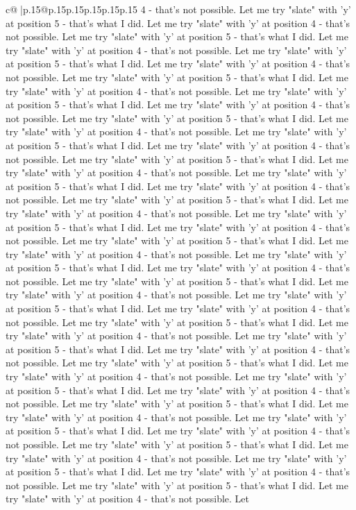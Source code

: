 \documentclass{article}
\begin{document}
{\begin{supertabular}{c@{$\;$}|p{.15\linewidth}@{}p{.15\linewidth}p{.15\linewidth}p{.15\linewidth}p{.15\linewidth}p{.15\linewidth}}
{{{4 {-} that's not possible. Let me try "slate" with 'y' at position 5 {-} that's what I did. Let me try "slate" with 'y' at position 4 {-} that's not possible. Let me try "slate" with 'y' at position 5 {-} that's what I did. Let me try "slate" with 'y' at position 4 {-} that's not possible. Let me try "slate" with 'y' at position 5 {-} that's what I did. Let me try "slate" with 'y' at position 4 {-} that's not possible. Let me try "slate" with 'y' at position 5 {-} that's what I did. Let me try "slate" with 'y' at position 4 {-} that's not possible. Let me try "slate" with 'y' at position 5 {-} that's what I did. Let me try "slate" with 'y' at position 4 {-} that's not possible. Let me try "slate" with 'y' at position 5 {-} that's what I did. Let me try "slate" with 'y' at position 4 {-} that's not possible. Let me try "slate" with 'y' at position 5 {-} that's what I did. Let me try "slate" with 'y' at position 4 {-} that's not possible. Let me try "slate" with 'y' at position 5 {-} that's what I did. Let me try "slate" with 'y' at position 4 {-} that's not possible. Let me try "slate" with 'y' at position 5 {-} that's what I did. Let me try "slate" with 'y' at position 4 {-} that's not possible. Let me try "slate" with 'y' at position 5 {-} that's what I did. Let me try "slate" with 'y' at position 4 {-} that's not possible. Let me try "slate" with 'y' at position 5 {-} that's what I did. Let me try "slate" with 'y' at position 4 {-} that's not possible. Let me try "slate" with 'y' at position 5 {-} that's what I did. Let me try "slate" with 'y' at position 4 {-} that's not possible. Let me try "slate" with 'y' at position 5 {-} that's what I did. Let me try "slate" with 'y' at position 4 {-} that's not possible. Let me try "slate" with 'y' at position 5 {-} that's what I did. Let me try "slate" with 'y' at position 4 {-} that's not possible. Let me try "slate" with 'y' at position 5 {-} that's what I did. Let me try "slate" with 'y' at position 4 {-} that's not possible. Let me try "slate" with 'y' at position 5 {-} that's what I did. Let me try "slate" with 'y' at position 4 {-} that's not possible. Let me try "slate" with 'y' at position 5 {-} that's what I did. Let me try "slate" with 'y' at position 4 {-} that's not possible. Let me try "slate" with 'y' at position 5 {-} that's what I did. Let me try "slate" with 'y' at position 4 {-} that's not possible. Let me try "slate" with 'y' at position 5 {-} that's what I did. Let me try "slate" with 'y' at position 4 {-} that's not possible. Let me try "slate" with 'y' at position 5 {-} that's what I did. Let me try "slate" with 'y' at position 4 {-} that's not possible. Let me try "slate" with 'y' at position 5 {-} that's what I did. Let me try "slate" with 'y' at position 4 {-} that's not possible. Let me try "slate" with 'y' at position 5 {-} that's what I did. Let me try "slate" with 'y' at position 4 {-} that's not possible. Let me try "slate" with 'y' at position 5 {-} that's what I did. Let me try "slate" with 'y' at position 4 {-} that's not possible. Let me try "slate" with 'y' at position 5 {-} that's what I did. Let me try "slate" with 'y' at position 4 {-} that's not possible. Let }}}
\end{supertabular}}
\end{document}
